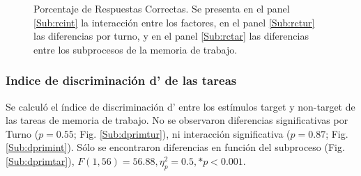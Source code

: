 \documentclass[12pt,letterpaper,final]{article}
\begin{document}
\begin{figure}[h]
	\caption{Porcentaje de Respuestas Correctas. Se presenta en el panel \ref{Sub:rcint} la interacción entre los factores, en el panel \ref{Sub:rctur} las diferencias por turno, y en el panel \ref{Sub:rctar} las diferencias entre los subprocesos de la memoria de trabajo.}
	\label{fig:rc}
\end{figure}

\subsubsection{Indice de discriminación d’ de las tareas}
Se calculó el índice de discriminación d’ entre los estímulos target y non-target de las tareas de memoria de trabajo.  No se observaron diferencias significativas por Turno ($p= 0.55$; Fig. \ref{Sub:dprimtur}), ni interacción significativa ($p= 0.87$; Fig. \ref{Sub:dprimint}). Sólo se encontraron diferencias en función del subproceso (Fig. \ref{Sub:dprimtar}),  $ F (1,56)= 56.88, \eta_{p}^{2}= 0.5,  *p<0.001.$
\end{document}
